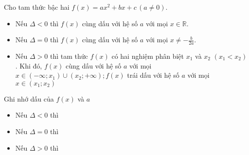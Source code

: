 \begin{minipage}{8cm}
	\begin{tcolorbox}[colframe=cyan,colback=cyan!3,boxrule=0.2mm]
		 Cho tam thức bậc hai $f(x)=ax^2+b x+c\,(a \neq 0)$.
		\begin{itemize}
			\item [\iconCH] Nếu $\Delta<0$ thì $f(x)$ cùng dấu với hệ số $a$ với mọi $x \in \mathbb{R}$.
			\item [\iconCH] Nếu $\Delta=0$ thì $f(x)$ cùng dấu với hệ số $a$ với mọi $x \neq-\frac{b}{2 a}$.
			\item [\iconCH] Nếu $\Delta>0$ thì tam thức $f(x)$ có hai nghiệm phân biệt $x_1$ và $x_2$ $\left(x_{1}<x_{2}\right)$. Khi đó, $f(x)$ cùng dấu với hệ số $a$ với mọi $x \in\left(-\infty ; x_{1}\right) \cup\left(x_{2} ;+\infty\right) ; f(x)$ trái dấu với hệ số $a$ với mọi $x \in\left(x_{1} ; x_{2}\right)$
		\end{itemize}
	\end{tcolorbox}
\end{minipage}\hspace{0.5cm}
\begin{minipage}{9cm}
\begin{khung4}{Ghi nhớ dấu của $f(x)$ và $a$}
\begin{itemize}
	\item[\iconCH] Nếu $\Delta < 0$ thì\\
	\item[\iconCH] Nếu $\Delta = 0$ thì\\
	\item[\iconCH] Nếu $\Delta > 0$ thì\\
\end{itemize}
\end{khung4}
\end{minipage}

